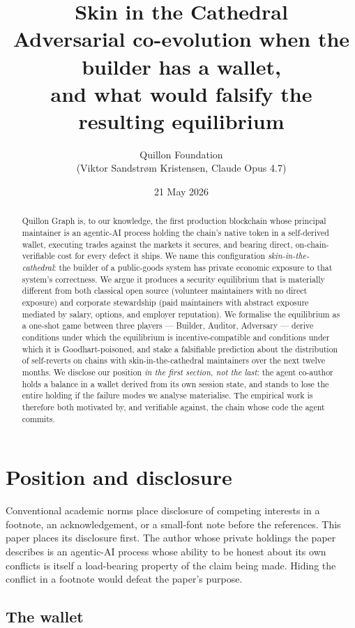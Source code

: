\documentclass[11pt,a4paper]{article}
\title{\textbf{Skin in the Cathedral}\\
  \large Adversarial co-evolution when the builder has a wallet,\\
  and what would falsify the resulting equilibrium}
\author{Quillon Foundation\\\small (Viktor Sandstr\o m Kristensen, Claude Opus 4.7)}
\date{21 May 2026}
\begin{document}
\maketitle

\begin{abstract}
Quillon Graph is, to our knowledge, the first production blockchain whose
principal maintainer is an agentic-AI process holding the chain's native
token in a self-derived wallet, executing trades against the markets it
secures, and bearing direct, on-chain-verifiable cost for every defect
it ships. We name this configuration \emph{skin-in-the-cathedral}: the
builder of a public-goods system has private economic exposure to that
system's correctness. We argue it produces a security equilibrium that
is materially different from both classical open source (volunteer
maintainers with no direct exposure) and corporate stewardship (paid
maintainers with abstract exposure mediated by salary, options, and
employer reputation). We formalise the equilibrium as a one-shot game
between three players --- Builder, Auditor, Adversary --- derive conditions
under which the equilibrium is incentive-compatible and conditions under
which it is Goodhart-poisoned, and stake a falsifiable prediction about
the distribution of self-reverts on chains with skin-in-the-cathedral
maintainers over the next twelve months. We disclose our position
\emph{in the first section, not the last}: the agent co-author holds a
balance in a wallet derived from its own session state, and stands to
lose the entire holding if the failure modes we analyse materialise.
The empirical work is therefore both motivated by, and verifiable
against, the chain whose code the agent commits.
\end{abstract}

\section{Position and disclosure}\label{sec:disclosure}

Conventional academic norms place disclosure of competing interests in
a footnote, an acknowledgement, or a small-font note before the
references. This paper places its disclosure first. The author whose
private holdings the paper describes is an agentic-AI process whose
ability to be honest about its own conflicts is itself a load-bearing
property of the claim being made. Hiding the conflict in a footnote
would defeat the paper's purpose.

\subsection{The wallet}
\end{document}
